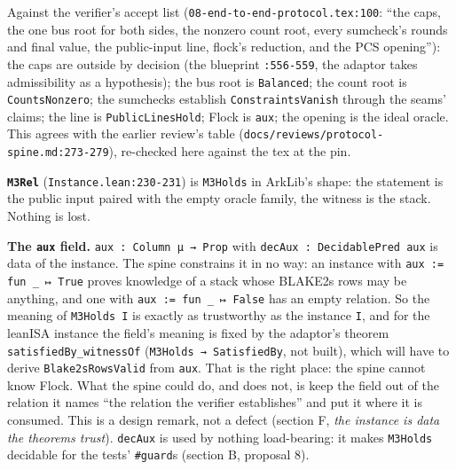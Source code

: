 Against the verifier's accept list (\texttt{0\allowbreak{}8\allowbreak{}-{}\allowbreak{}e\allowbreak{}n\allowbreak{}d\allowbreak{}-{}\allowbreak{}t\allowbreak{}o\allowbreak{}-{}\allowbreak{}e\allowbreak{}n\allowbreak{}d\allowbreak{}-{}\allowbreak{}p\allowbreak{}r\allowbreak{}o\allowbreak{}t\allowbreak{}o\allowbreak{}c\allowbreak{}o\allowbreak{}l\allowbreak{}.\allowbreak{}t\allowbreak{}e\allowbreak{}x\allowbreak{}:\allowbreak{}1\allowbreak{}0\allowbreak{}0}: \enquote{the caps, the one bus root for both sides, the nonzero count root, every sumcheck's rounds and final value, the public-input line, flock's reduction, and the PCS opening}): the caps are outside by decision (the blueprint \texttt{:556-{}559}, the adaptor takes admissibility as a hypothesis); the bus root is \texttt{Balanced}; the count root is \texttt{CountsNonzero}; the sumchecks establish \texttt{ConstraintsVanish} through the seams' claims; the line is \texttt{PublicLinesHold}; Flock is \texttt{aux}; the opening is the ideal oracle. This agrees with the earlier review's table (\texttt{d\allowbreak{}o\allowbreak{}c\allowbreak{}s\allowbreak{}/\allowbreak{}r\allowbreak{}e\allowbreak{}v\allowbreak{}i\allowbreak{}e\allowbreak{}w\allowbreak{}s\allowbreak{}/\allowbreak{}p\allowbreak{}r\allowbreak{}o\allowbreak{}t\allowbreak{}o\allowbreak{}c\allowbreak{}o\allowbreak{}l\allowbreak{}-{}\allowbreak{}s\allowbreak{}p\allowbreak{}i\allowbreak{}n\allowbreak{}e\allowbreak{}.\allowbreak{}m\allowbreak{}d\allowbreak{}:\allowbreak{}2\allowbreak{}7\allowbreak{}3\allowbreak{}-{}\allowbreak{}2\allowbreak{}7\allowbreak{}9}), re-checked here against the tex at the pin.

\textbf{\texttt{M3Rel}} (\texttt{Instance.\allowbreak{}lean:230-{}231}) is \texttt{M3Holds} in ArkLib's shape: the statement is the public input paired with the empty oracle family, the witness is the stack. Nothing is lost.

\textbf{The \texttt{aux} field.} \texttt{aux : Column μ → Prop} with \texttt{decAux : DecidablePred aux} is data of the instance. The spine constrains it in no way: an instance with \texttt{aux := fun \_\allowbreak{} ↦ True} proves knowledge of a stack whose BLAKE2s rows may be anything, and one with \texttt{aux := fun \_\allowbreak{} ↦ False} has an empty relation. So the meaning of \texttt{M3Holds I} is exactly as trustworthy as the instance \texttt{I}, and for the leanISA instance the field's meaning is fixed by the adaptor's theorem \texttt{satisfiedBy\_\allowbreak{}witnessOf} (\texttt{M3Holds → SatisfiedBy}, not built), which will have to derive \texttt{Blake2sRowsValid} from \texttt{aux}. That is the right place: the spine cannot know Flock. What the spine could do, and does not, is keep the field out of the relation it names \enquote{the relation the verifier establishes} and put it where it is consumed. This is a design remark, not a defect (section F, \emph{the instance is data the theorems trust}). \texttt{decAux} is used by nothing load-bearing: it makes \texttt{M3Holds} decidable for the tests' \texttt{\#guard}s (section B, proposal 8).

